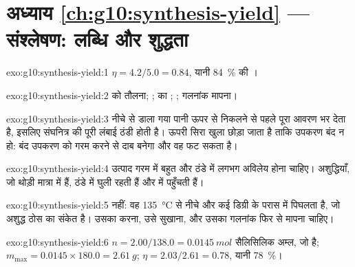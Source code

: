 \section*{अध्याय \ref{ch:g10:synthesis-yield} --- संश्लेषण: लब्धि और शुद्धता}

\begin{solution}{exo:g10:synthesis-yield:1}
$\eta = 4.2 / 5.0 = 0.84$, यानी \qty{84}{\percent} की ।
\end{solution}

\begin{solution}{exo:g10:synthesis-yield:2}
 को तौलना; ;  का ; ; गलनांक मापना।
\end{solution}

\begin{solution}{exo:g10:synthesis-yield:3}
नीचे से डाला गया पानी ऊपर से निकलने से पहले पूरा आवरण भर देता है, इसलिए
संघनित्र की पूरी लंबाई ठंडी होती है। ऊपरी सिरा खुला छोड़ा जाता है ताकि उपकरण
बंद न हो: बंद उपकरण को गरम करने से दाब बनेगा और वह
फट सकता है।
\end{solution}

\begin{solution}{exo:g10:synthesis-yield:4}
उत्पाद गरम  में बहुत  और ठंडे  में लगभग अविलेय होना
चाहिए। अशुद्धियाँ, जो थोड़ी मात्रा में हैं, ठंडे  में
घुली रहती हैं और  में पहुँचती हैं।
\end{solution}

\begin{solution}{exo:g10:synthesis-yield:5}
नहीं: वह \qty{135}{\celsius} से नीचे और कई डिग्री के परास में पिघलता है, जो
अशुद्ध ठोस का संकेत है। उसका  करना, उसे सुखाना,
और उसका गलनांक फिर से मापना चाहिए।
\end{solution}

\begin{solution}{exo:g10:synthesis-yield:6}
$n = 2.00 / 138.0 = \qty{0.0145}{mol}$ सैलिसिलिक अम्ल, जो  है; $m_{\max} = 0.0145 \times 180.0 = \qty{2.61}{g}$;
$\eta = 2.03 / 2.61 = 0.78$, यानी \qty{78}{\percent}।
\end{solution}


